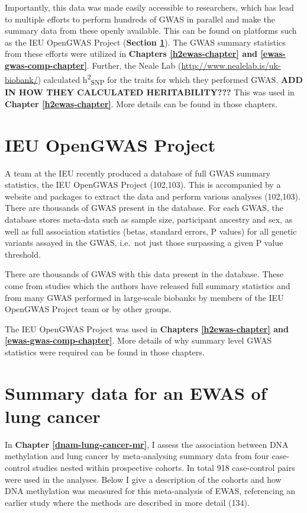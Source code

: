 \documentclass[11pt,oneside]{bristolthesis}
\begin{document}
Importantly, this data was made easily accessible to researchers, which has lead to multiple efforts to perform hundreds of GWAS in parallel and make the summary data from these openly available. This can be found on platforms such as the IEU OpenGWAS Project (\textbf{Section \ref{ieu-opengwas-project-02}}). The GWAS summary statistics from these efforts were utilized in \textbf{Chapters \ref{h2ewas-chapter} and \ref{ewas-gwas-comp-chapter}}. Further, the Neale Lab (\url{http://www.nealelab.is/uk-biobank/}) calculated h\textsuperscript{2}\textsubscript{SNP} for the traits for which they performed GWAS. \textbf{ADD IN HOW THEY CALCULATED HERITABILITY???} This was used in \textbf{Chapter \ref{h2ewas-chapter}}. More details can be found in those chapters.

\hypertarget{ieu-opengwas-project-02}{%
\section{IEU OpenGWAS Project}\label{ieu-opengwas-project-02}}

A team at the IEU recently produced a database of full GWAS summary statistics, the IEU OpenGWAS Project (102,103). This is accompanied by a website and packages to extract the data and perform various analyses (102,103). There are thousands of GWAS present in the database. For each GWAS, the database stores meta-data such as sample size, participant ancestry and sex, as well as full association statistics (betas, standard errors, P values) for all genetic variants assayed in the GWAS, i.e.~not just those surpassing a given P value threshold.

There are thousands of GWAS with this data present in the database. These come from studies which the authors have released full summary statistics and from many GWAS performed in large-scale biobanks by members of the IEU OpenGWAS Project team or by other groups.

The IEU OpenGWAS Project was used in \textbf{Chapters \ref{h2ewas-chapter} and \ref{ewas-gwas-comp-chapter}}. More details of why summary level GWAS statistics were required can be found in those chapters.

\hypertarget{lc-ewas-data}{%
\section{Summary data for an EWAS of lung cancer}\label{lc-ewas-data}}

In \textbf{Chapter \ref{dnam-lung-cancer-mr}}, I assess the association between DNA methylation and lung cancer by meta-analysing summary data from four case-control studies nested within prospective cohorts. In total 918 case-control pairs were used in the analyses. Below I give a description of the cohorts and how DNA methylation was measured for this meta-analysis of EWAS, referencing an earlier study where the methods are described in more detail (134).
\end{document}
